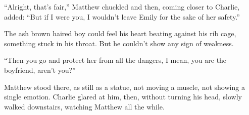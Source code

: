 “Alright, that’s fair,” Matthew chuckled and then, coming closer to Charlie, added: “But if I were you, I wouldn’t leave Emily for the sake of her safety.”

The ash brown haired boy could feel his heart beating against his rib cage, something stuck in his throat. But he couldn’t show any sign of weakness.

“Then you go and protect her from all the dangers, I mean, you are the boyfriend, aren’t you?”

Matthew stood there, as still as a statue, not moving a muscle, not showing a single emotion. Charlie glared at him, then, without turning his head, slowly walked downstairs, watching Matthew all the while.